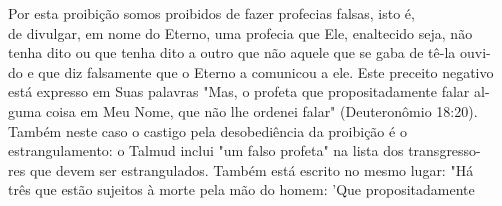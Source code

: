 Por esta proibição somos proibidos de fazer profecias falsas, isto é,\\
de divulgar, em nome do Eterno, uma profecia que Ele, enaltecido seja,
não\\
tenha dito ou que tenha dito a outro que não aquele que se gaba de tê-la
ouvi-\\
do e que diz falsamente que o Eterno a comunicou a ele. Este preceito
negativo\\
está expresso em Suas palavras "Mas, o profeta que propositadamente
falar al-\\
guma coisa em Meu Nome, que não lhe ordenei falar" (Deuteronômio
18:20).\\
Também neste caso o castigo pela desobediência da proibição é o\\
estrangulamento: o Talmud inclui "um falso profeta" na lista dos
transgresso-\\
res que devem ser estrangulados. Também está escrito no mesmo lugar:
"Há\\
três que estão sujeitos à morte pela mão do homem: 'Que propositadamente

